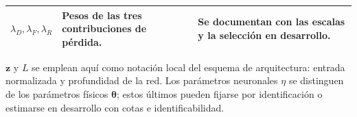 \begin{table}[p]
\begin{tabularx}{\textwidth}{@{}>{\raggedright\arraybackslash}p{}>{\raggedright\arraybackslash}X>{\raggedright\arraybackslash}p{}@{}}
$\lambda_D,\lambda_F,\lambda_R$ & Pesos de las tres contribuciones de pérdida. & Se documentan con las escalas y la selección en desarrollo. \\
\bottomrule
\end{tabularx}
\endgroup
\par\smallskip
\begin{minipage}{\textwidth}\footnotesize
$\mathbf z$ y $L$ se emplean aquí como notación local del esquema de arquitectura: entrada normalizada y profundidad de la red. Los parámetros neuronales $\eta$ se distinguen de los parámetros físicos $\boldsymbol\theta$; estos últimos pueden fijarse por identificación o estimarse en desarrollo con cotas e identificabilidad.
\end{minipage}
\end{table}

